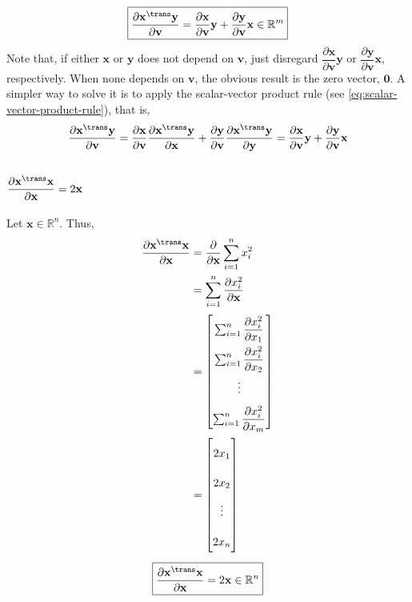 \begin{align}
    \boxed{\dfrac{\partial \mathbf{x}^\trans \mathbf{y}}{\partial \mathbf{v}} = \dfrac{\partial \mathbf{x}}{\partial \mathbf{v}}\mathbf{y} + \dfrac{\partial \mathbf{y}}{\partial \mathbf{v}}\mathbf{x} \in \mathbb{R}^{m}}
\end{align}
Note that, if either \(\mathbf{x}\) or \(\mathbf{y}\) does not depend on \(\mathbf{v}\), just disregard \(\dfrac{\partial \mathbf{x}}{\partial \mathbf{v}}\mathbf{y}\) or \(\dfrac{\partial \mathbf{y}}{\partial \mathbf{v}}\mathbf{x}\), respectively. When none depends on \(\mathbf{v}\), the obvious result is the zero vector, \(\mathbf{0}\). A simpler way to solve it is to apply the scalar-vector product rule (see \eqref{eq:scalar-vector-product-rule}), that is,
\begin{align}
    \dfrac{\partial \mathbf{x}^\trans \mathbf{y}}{\partial \mathbf{v}} = \dfrac{\partial \mathbf{x}}{\partial \mathbf{v}} \dfrac{\partial \mathbf{x}^\trans \mathbf{y}}{\partial \mathbf{x}} + \dfrac{\partial \mathbf{y}}{\partial \mathbf{v}} \dfrac{\partial \mathbf{x}^\trans \mathbf{y}}{\partial \mathbf{y}} = \dfrac{\partial \mathbf{x}}{\partial \mathbf{v}}\mathbf{y} + \dfrac{\partial \mathbf{y}}{\partial \mathbf{v}}\mathbf{x}
\end{align}

\subsection{\(\dfrac{\partial \mathbf{x}^\trans \mathbf{x}}{\partial \mathbf{x}} = 2\mathbf{x}\)}
Let \(\mathbf{x} \in \mathbb{R}^{n}\). Thus,
\begin{align}
    \dfrac{\partial \mathbf{x}^\trans \mathbf{x}}{\partial \mathbf{x}} & = \dfrac{\partial}{\partial \mathbf{x}}\sum_{i=1}^{n} x_i^2 \\
    & = \sum_{i=1}^{n} \dfrac{\partial x_i^2}{\partial \mathbf{x}} \\
    & = \renewcommand{\arraystretch}{2.2}\begin{bmatrix}
        \sum_{i=1}^{n} \dfrac{\partial x_i^2}{\partial x_1} \\
        \sum_{i=1}^{n} \dfrac{\partial x_i^2}{\partial x_2} \\
        \vdots \\
        \sum_{i=1}^{n} \dfrac{\partial x_i^2}{\partial x_m} \\
    \end{bmatrix} \\
    & = \renewcommand{\arraystretch}{2.2}\begin{bmatrix}
        2x_1 \\
        2x_2 \\
        \vdots \\
        2x_n \\
    \end{bmatrix}
\end{align}
\begin{align}
    \boxed{\dfrac{\partial \mathbf{x}^\trans \mathbf{x}}{\partial \mathbf{x}} = 2\mathbf{x} \in \mathbb{R}^n}
\end{align}

